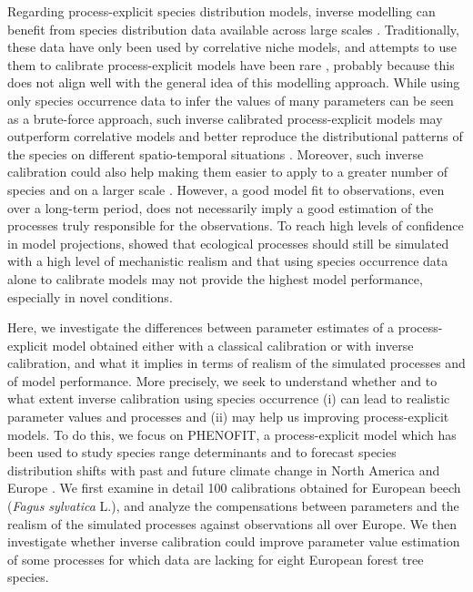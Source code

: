 \documentclass[letterpaper,8pt]{extarticle}  %
\begin{document}
\begin{doublespacing}
\begin{linenumbers}
Regarding process-explicit species distribution models, inverse modelling can benefit from species distribution data available across large scales \citep{Evans2016}. Traditionally, these data have only been used by correlative niche models, and attempts to use them to calibrate process-explicit models have been rare \citep{Higgins2012, VanderMeersch2023}, probably because this does not align well with the general idea of this modelling approach. While using only species occurrence data to infer the values of many parameters can be seen as a brute-force approach, such inverse calibrated process-explicit models may outperform correlative models and better reproduce the distributional patterns of the species on different spatio-temporal situations \citep{Higgins2020, VanderMeersch2024}.  Moreover, such inverse calibration could also help making them easier to apply to a greater number of species and on a larger scale \citep[e.g.][]{Conradi2024}. However, a good model fit to observations, even over a long-term period, does not necessarily imply a good estimation of the processes truly responsible for the observations. 
To reach high levels of confidence in model projections,  \cite{VanderMeersch2024} showed that ecological processes should still be simulated with a high level of mechanistic realism and that using species occurrence data alone to calibrate models may not provide the highest model performance, especially in novel conditions. 

Here, we investigate the differences between parameter estimates of a process-explicit model obtained either with a classical calibration or with inverse calibration, and what it implies in terms of realism of the simulated processes and of model performance. More precisely, we seek to understand whether and to what extent inverse calibration using species occurrence (i) can lead to realistic parameter values and processes and (ii) may help us improving process-explicit models. To do this, we focus on PHENOFIT, a process-explicit model which has been used to study species range determinants and to forecast species distribution shifts with past and future climate change in North America and Europe
\citep{Morin2007, Saltre2013, Saltre2015, Cheaib2012}. We first examine in detail 100 calibrations obtained for European beech (\emph{Fagus sylvatica} L.), and analyze the compensations between parameters and the realism of the simulated processes against observations all over Europe. We then investigate whether inverse calibration could improve parameter value estimation of some processes for which data are lacking for eight European forest tree species. 



\end{linenumbers}
\end{doublespacing}
\end{document}
